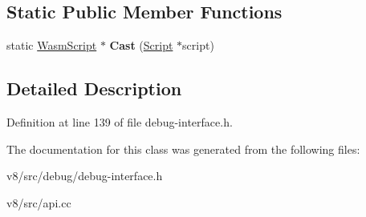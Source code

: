 \subsection*{Static Public Member Functions}
\begin{DoxyCompactItemize}
\item 
\mbox{\label{classv8_1_1debug_1_1WasmScript_a868004f34c83a4e6a2975c125b226c76}} 
static \mbox{\hyperlink{classv8_1_1debug_1_1WasmScript}{Wasm\+Script}} $\ast$ {\bfseries Cast} (\mbox{\hyperlink{classv8_1_1debug_1_1Script}{Script}} $\ast$script)
\end{DoxyCompactItemize}


\subsection{Detailed Description}


Definition at line 139 of file debug-\/interface.\+h.



The documentation for this class was generated from the following files\+:\begin{DoxyCompactItemize}
\item 
v8/src/debug/debug-\/interface.\+h\item 
v8/src/api.\+cc\end{DoxyCompactItemize}
